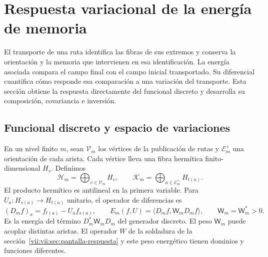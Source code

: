 
\section{Respuesta variacional de la energía de memoria}
\label{vii:vii:sec:variacion-memoria}

El transporte de una ruta identifica las fibras de sus extremos y conserva
la orientación y la memoria que intervienen en esa identificación. La energía
asociada compara el campo final con el campo inicial transportado. Su
diferencial cuantifica cómo responde esa comparación a una variación del
transporte. Esta sección obtiene la respuesta directamente del funcional
discreto y desarrolla su composición, covariancia e inversión.

\subsection{Funcional discreto y espacio de variaciones}
\label{vii:vii:subsec:funcional-memoria}

En un nivel finito \(m\), sean \(\mathcal V_m\) los vértices de la
publicación de rutas y \(\mathcal E_m^+\) una orientación de cada arista.
Cada vértice lleva una fibra hermítica finito-dimensional \(H_v\).
Definimos
\[
 \mathcal H_m=\bigoplus_{v\in\mathcal V_m}H_v,\qquad
 \mathcal K_m=\bigoplus_{a\in\mathcal E_m^+}H_{t(a)}.
\]
El producto hermítico es antilineal en la primera variable.
Para \(U_a:H_{s(a)}\to H_{t(a)}\) unitario, el operador de diferencias es
\begin{equation}
 (D_mf)_a=f_{t(a)}-U_af_{s(a)},\qquad
 E_m(f,U)=\langle D_mf,\mathsf W_mD_mf\rangle,\qquad
 \mathsf W_m=\mathsf W_m^*>0.
 \label{vii:vii:eq:energia-memoria-discreta}
\end{equation}
Es la energía del término \(D_m^*\mathsf W_mD_m\) del generador discreto.
El peso \(\mathsf W_m\) puede acoplar distintas aristas. El operador \(W\)
de la soldadura de la sección~\ref{vii:vii:sec:pantalla-respuesta} y este peso
energético tienen dominios y funciones diferentes.

